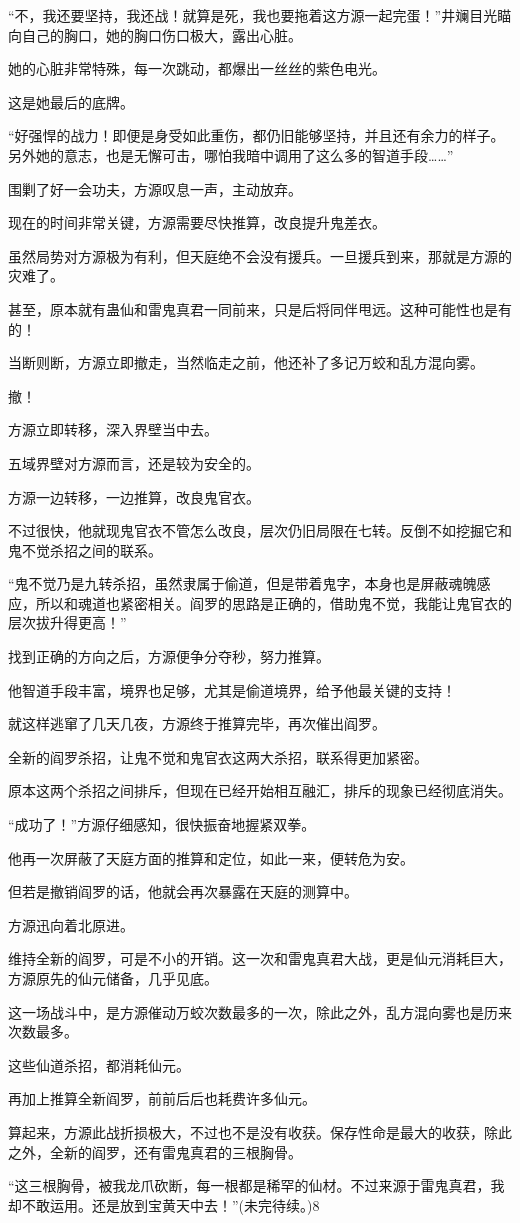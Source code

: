 \begin{this_body}
“不，我还要坚持，我还战！就算是死，我也要拖着这方源一起完蛋！”井斓目光瞄向自己的胸口，她的胸口伤口极大，露出心脏。

她的心脏非常特殊，每一次跳动，都爆出一丝丝的紫色电光。

这是她最后的底牌。

“好强悍的战力！即便是身受如此重伤，都仍旧能够坚持，并且还有余力的样子。另外她的意志，也是无懈可击，哪怕我暗中调用了这么多的智道手段……”

围剿了好一会功夫，方源叹息一声，主动放弃。

现在的时间非常关键，方源需要尽快推算，改良提升鬼差衣。

虽然局势对方源极为有利，但天庭绝不会没有援兵。一旦援兵到来，那就是方源的灾难了。

甚至，原本就有蛊仙和雷鬼真君一同前来，只是后将同伴甩远。这种可能性也是有的！

当断则断，方源立即撤走，当然临走之前，他还补了多记万蛟和乱方混向雾。

撤！

方源立即转移，深入界壁当中去。

五域界壁对方源而言，还是较为安全的。

方源一边转移，一边推算，改良鬼官衣。

不过很快，他就现鬼官衣不管怎么改良，层次仍旧局限在七转。反倒不如挖掘它和鬼不觉杀招之间的联系。

“鬼不觉乃是九转杀招，虽然隶属于偷道，但是带着鬼字，本身也是屏蔽魂魄感应，所以和魂道也紧密相关。阎罗的思路是正确的，借助鬼不觉，我能让鬼官衣的层次拔升得更高！”

找到正确的方向之后，方源便争分夺秒，努力推算。

他智道手段丰富，境界也足够，尤其是偷道境界，给予他最关键的支持！

就这样逃窜了几天几夜，方源终于推算完毕，再次催出阎罗。

全新的阎罗杀招，让鬼不觉和鬼官衣这两大杀招，联系得更加紧密。

原本这两个杀招之间排斥，但现在已经开始相互融汇，排斥的现象已经彻底消失。

“成功了！”方源仔细感知，很快振奋地握紧双拳。

他再一次屏蔽了天庭方面的推算和定位，如此一来，便转危为安。

但若是撤销阎罗的话，他就会再次暴露在天庭的测算中。

方源迅向着北原进。

维持全新的阎罗，可是不小的开销。这一次和雷鬼真君大战，更是仙元消耗巨大，方源原先的仙元储备，几乎见底。

这一场战斗中，是方源催动万蛟次数最多的一次，除此之外，乱方混向雾也是历来次数最多。

这些仙道杀招，都消耗仙元。

再加上推算全新阎罗，前前后后也耗费许多仙元。

算起来，方源此战折损极大，不过也不是没有收获。保存性命是最大的收获，除此之外，全新的阎罗，还有雷鬼真君的三根胸骨。

“这三根胸骨，被我龙爪砍断，每一根都是稀罕的仙材。不过来源于雷鬼真君，我却不敢运用。还是放到宝黄天中去！”(未完待续。)8

\end{this_body}


